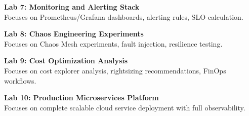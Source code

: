 \vspace{0.2cm}

\noindent\textbf{Lab 7: Monitoring and Alerting Stack} \\
Focuses on Prometheus/Grafana dashboards, alerting rules, SLO calculation.

\vspace{0.2cm}

\noindent\textbf{Lab 8: Chaos Engineering Experiments} \\
Focuses on Chaos Mesh experiments, fault injection, resilience testing.

\vspace{0.2cm}

\noindent\textbf{Lab 9: Cost Optimization Analysis} \\
Focuses on cost explorer analysis, rightsizing recommendations, FinOps workflows.

\vspace{0.2cm}

\noindent\textbf{Lab 10: Production Microservices Platform} \\
Focuses on complete scalable cloud service deployment with full observability.

\vspace{0.2cm}

\newpage
{}
